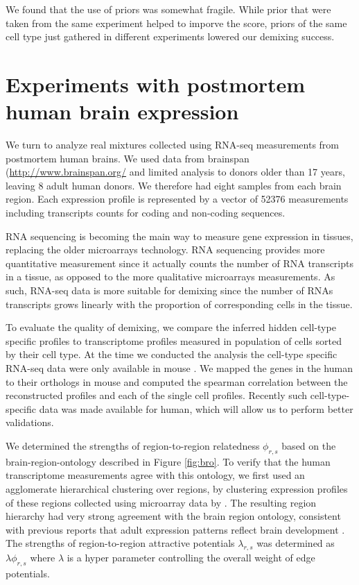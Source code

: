 \documentclass{article} %
\begin{document}
We found that the use of priors was somewhat fragile. While prior that were taken from the same experiment helped to imporve the score, priors of the same cell type just gathered in different experiments lowered our demixing success. 

\section{Experiments with postmortem human brain expression}
\label{Human_exp}
We turn to analyze real mixtures collected using RNA-seq measurements from postmortem human brains. We used data from brainspan \cite{brainspan} (\url{http://www.brainspan.org/} and limited analysis to donors older than 17 years, leaving 8 adult human donors. We therefore had eight samples from each brain region. Each expression profile is represented by a vector of 52376 measurements including transcripts counts for coding and non-coding sequences. 

RNA sequencing is becoming the main way to measure gene expression in tissues, replacing the older microarrays technology. RNA sequencing provides more quantitative measurement since it actually counts the number of RNA transcripts in a tissue, as opposed to the more qualitative microarrays measurements. As such, RNA-seq data is more suitable for demixing since the number of RNAs transcripts grows linearly with the proportion of corresponding cells in the tissue.

To evaluate the quality of demixing, we compare the inferred hidden cell-type specific profiles to transcriptome profiles measured in population of cells sorted by their cell type. At the time we conducted the analysis the cell-type specific RNA-seq data were only available in mouse \cite{barres2014}. We mapped the genes in the human to their orthologs in mouse and computed the spearman correlation between the reconstructed profiles and each of the single cell profiles. Recently such cell-type-specific data was made available for human, which will allow us to perform better validations. 

We determined the strengths of region-to-region relatedness $\phi_{r,s}$ based on the brain-region-ontology described in Figure \ref{fig:bro}. To verify that the human transcriptome measurements agree with this ontology, we first used an agglomerate hierarchical clustering over regions, by clustering expression profiles of these regions collected using microarray data by \cite{kang2011spatio}. The resulting region hierarchy had very strong agreement with the brain region ontology, consistent with previous reports that adult expression patterns reflect brain development \cite{zapala2005}. The strengths of region-to-region attractive potentials $\lambda_{r,s}$ was determined as $\lambda \phi_{r,s}$ where $\lambda$ is a hyper parameter controlling the overall weight of edge potentials. 
\end{document}
